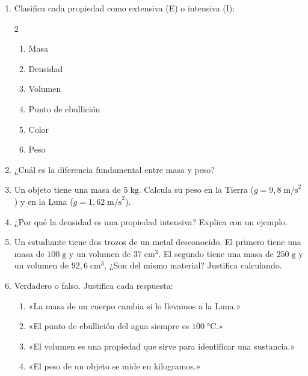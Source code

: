 \documentclass[12pt, letterpaper]{article}
\begin{document}
\begin{enumerate}[leftmargin=*, resume]
  \item \facil{} Clasifica cada propiedad como extensiva (E) o intensiva (I):
        \begin{multicols}{2}
          \begin{enumerate}[label=\alph*)]
            \item Masa
            \item Densidad
            \item Volumen
            \item Punto de ebullición
            \item Color
            \item Peso
          \end{enumerate}
        \end{multicols}

  \item \facil{} ¿Cuál es la diferencia fundamental entre masa y peso?

  \item \facil{} Un objeto tiene una masa de $5\;\text{kg}$. Calcula su peso en la Tierra ($g = 9{,}8\;\text{m/s}^2$) y en la Luna ($g = 1{,}62\;\text{m/s}^2$).

  \item \facil{} ¿Por qué la densidad es una propiedad intensiva? Explica con un ejemplo.

  \item \medio{} Un estudiante tiene dos trozos de un metal desconocido. El primero tiene una masa de $100\;\text{g}$ y un volumen de $37\;\text{cm}^3$. El segundo tiene una masa de $250\;\text{g}$ y un volumen de $92{,}6\;\text{cm}^3$. ¿Son del mismo material? Justifica calculando.

  \item \medio{} Verdadero o falso. Justifica cada respuesta:
        \begin{enumerate}[label=\alph*)]
          \item «La masa de un cuerpo cambia si lo llevamos a la Luna.»
          \item «El punto de ebullición del agua siempre es $100\;°\text{C}$.»
          \item «El volumen es una propiedad que sirve para identificar una sustancia.»
          \item «El peso de un objeto se mide en kilogramos.»
        \end{enumerate}


\end{enumerate}
\end{document}
